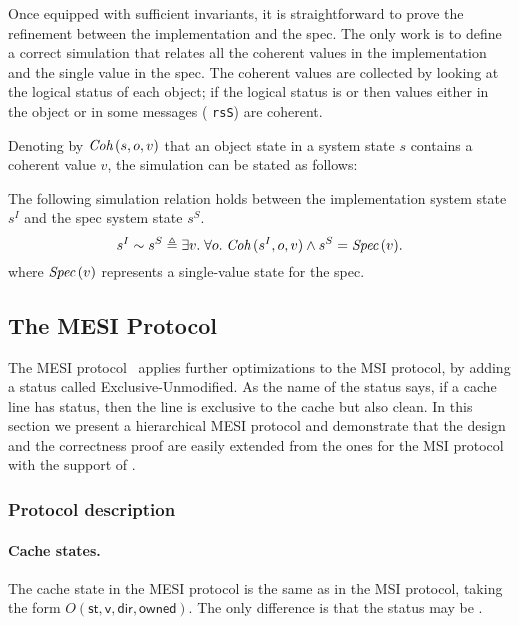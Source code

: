 \documentclass[sigplan,10pt,review,anonymous,screen]{acmart}\settopmatter{printfolios=true,printccs=false,printacmref=false}
\def\slstinline{\lstinline[basicstyle=\ttfamily\small]}
\begin{document}
Once equipped with sufficient invariants, it is straightforward to prove the refinement between the implementation and the spec.
The only work is to define a correct simulation that relates all the coherent values in the implementation and the single value in the spec.
The coherent values are collected by looking at the logical status of each object; if the logical status is \stS{} or \stM{} then values either in the object or in some messages (\eg{} \slstinline{rsS}) are coherent.

Denoting by $\textit{Coh}\,(s, o, v)$ that an object state in a system state $s$ contains a coherent value $v$, the simulation can be stated as follows:
\begin{theorem}
  The following simulation relation holds between the implementation system state $s^I$ and the spec system state $s^S$.
  \begin{displaymath}
    s^I \sim s^S \triangleq \exists v.\; \forall o.\; \textit{Coh}\,(s^I, o, v) \wedge s^S = \textit{Spec}\,(v).
  \end{displaymath}
  where $\textit{Spec}\,(v)$ represents a single-value state for the spec.
  \label{thm-msi-correct}
\end{theorem}

\subsection{The MESI Protocol}
\label{sec-mesi-protocol}

The MESI protocol~\cite{Papamarcos:1984} applies further optimizations to the MSI protocol, by adding a status called Exclusive-Unmodified.
As the name of the status says, if a cache line has \stE{} status, then the line is exclusive to the cache but also clean.
In this section we present a hierarchical MESI protocol and demonstrate that the design and the correctness proof are easily extended from the ones for the MSI protocol with the support of \hemiola{}.

\subsubsection{Protocol description}

\paragraph{Cache states.}
The cache state in the MESI protocol is the same as in the MSI protocol, taking the form $O(\textsf{st}, \textsf{v}, \textsf{dir}, \textsf{owned})$.
The only difference is that the status may be \stE{}.
\end{document}

